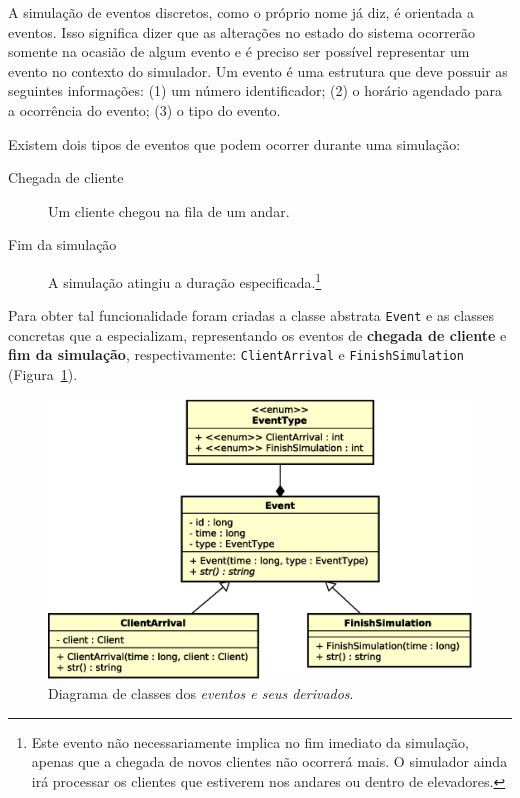 A simulação de eventos discretos, como o próprio nome já diz, é orientada a
eventos. Isso significa dizer que as alterações no estado do sistema ocorrerão
somente na ocasião de algum evento e é preciso ser possível representar um
evento no contexto do simulador. Um evento é uma estrutura que deve possuir as
seguintes informações: (1) um número identificador; (2) o horário agendado para
a ocorrência do evento; (3) o tipo do evento.

Existem dois tipos de eventos que podem ocorrer durante uma simulação:

\begin{description}
  \item[Chegada de cliente] Um cliente chegou na fila de um andar.

  \item[Fim da simulação] A simulação atingiu a duração
especificada.\footnote{Este evento não necessariamente implica no fim imediato
da simulação, apenas que a chegada de novos clientes não ocorrerá mais. O
simulador ainda irá processar os clientes que estiverem nos andares ou dentro de
elevadores.}

\end{description}

Para obter tal funcionalidade foram criadas a classe abstrata \texttt{Event} e
as classes concretas que a especializam, representando os eventos de
\textbf{chegada de cliente} e \textbf{fim da simulação}, respectivamente:
\texttt{ClientArrival} e \texttt{FinishSimulation}
(Figura~\ref{fig:diagram:events}).

\begin{figure}[htb!]
  \centering
  \includegraphics[scale=0.6]{img/Events}
  \caption{Diagrama de classes dos \textit{eventos e seus derivados}.}
\label{fig:diagram:events}
\end{figure}

